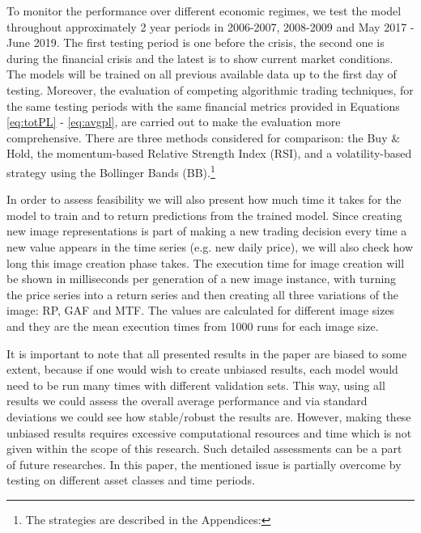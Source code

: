 \documentclass[12pt, a4paper]{article}
\begin{document}
To monitor the performance over different economic regimes, we test the model throughout approximately 2 year periods in 2006-2007, 2008-2009 and May 2017 - June 2019. The first testing period is one before the crisis, the second one is during the financial crisis and the latest is to show current market conditions. 
The models will be trained on all previous available data up to the first day of testing. 
Moreover, the evaluation of competing algorithmic trading techniques, for the same testing periods with the same financial metrics provided in Equations \ref{eq:totPL} - \ref{eq:avgpl}, are carried out to make the evaluation more comprehensive.
There are three methods considered for comparison: the Buy \& Hold, the momentum-based Relative Strength Index (RSI), and a volatility-based strategy using the Bollinger Bands (BB).\footnote{The strategies are described in the Appendices: }

In order to assess feasibility we will also present how much time it takes for the model to train and to return predictions from the trained model. Since creating new image representations is part of making a new trading decision every time a new value appears in the time series (e.g. new daily price), we will also check how long this image creation phase takes.
The execution time for image creation will be shown in milliseconds per generation of a new image instance, with turning the price series into a return series and then creating all three variations of the image: RP, GAF and MTF. The values are calculated for different image sizes and they are the mean execution times from 1000 runs for each image size.

It is important to note that all presented results in the paper are biased to some extent, because if one would wish to create unbiased results, each model would need to be run many times with different validation sets. This way, using all results we could assess the overall average performance and via standard deviations we could see how stable/robust the results are. However, making these unbiased results requires excessive computational resources and time which is not given within the scope of this research. Such detailed assessments can be a part of future researches. In this paper, the mentioned issue is partially overcome by testing on different asset classes and time periods.
\end{document}
